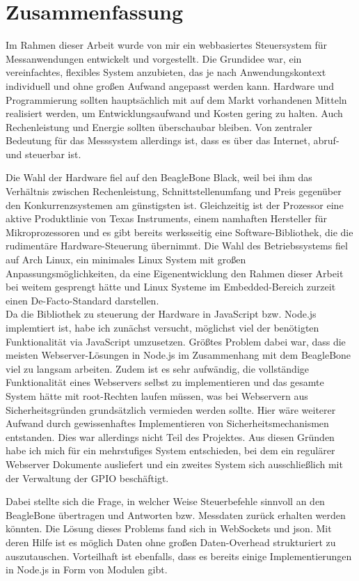 \chapter{Zusammenfassung}
Im Rahmen dieser Arbeit wurde von mir ein webbasiertes Steuersystem für Messanwendungen entwickelt und vorgestellt. Die Grundidee war, ein vereinfachtes, flexibles System anzubieten, das je nach Anwendungskontext individuell und ohne großen Aufwand angepasst werden kann. Hardware und Programmierung sollten hauptsächlich mit auf dem Markt vorhandenen Mitteln realisiert werden, um Entwicklungsaufwand und Kosten gering zu halten. Auch Rechenleistung und Energie sollten überschaubar bleiben. Von zentraler Bedeutung für das Messsystem allerdings ist, dass es über das Internet, abruf- und steuerbar ist.

Die Wahl der Hardware fiel auf den BeagleBone Black, weil bei ihm das Verhältnis zwischen Rechenleistung, Schnittstellenumfang und Preis gegenüber den Konkurrenzsystemen am günstigsten ist. Gleichzeitig ist der Prozessor eine aktive Produktlinie von Texas Instruments, einem namhaften Hersteller für Mikroprozessoren und es gibt bereits werksseitig eine Software-Bibliothek, die die rudimentäre Hardware-Steuerung übernimmt. Die Wahl des Betriebssystems fiel auf Arch Linux, ein minimales Linux System mit großen Anpassungsmöglichkeiten, da eine Eigenentwicklung den Rahmen dieser Arbeit bei weitem gesprengt hätte und Linux Systeme im Embedded-Bereich zurzeit einen De-Facto-Standard darstellen.\\

Da die Bibliothek zu steuerung der Hardware in JavaScript bzw. Node.js implemtiert ist, habe ich zunächst versucht, möglichst viel der benötigten Funktionalität via JavaScript umzusetzen. Größtes Problem dabei war, dass die meisten Webserver-Lösungen in Node.js im Zusammenhang mit dem BeagleBone viel zu langsam arbeiten. Zudem ist es sehr aufwändig,  die vollständige Funktionalität eines Webservers selbst zu implementieren und das gesamte System hätte mit root-Rechten laufen müssen, was bei Webservern aus Sicherheitsgründen grundsätzlich vermieden werden sollte. Hier wäre weiterer Aufwand durch gewissenhaftes Implementieren von Sicherheitsmechanismen entstanden. Dies war allerdings nicht Teil des Projektes. Aus diesen Gründen habe ich mich für ein mehrstufiges System entschieden, bei dem ein regulärer Webserver Dokumente ausliefert und ein zweites System sich ausschließlich mit der Verwaltung der GPIO beschäftigt.

Dabei stellte sich die Frage, in welcher Weise Steuerbefehle sinnvoll an den BeagleBone übertragen und Antworten bzw. Messdaten zurück erhalten werden könnten. Die Lösung dieses Problems fand sich in WebSockets und \gls{json}. Mit deren Hilfe ist es möglich Daten ohne großen Daten-Overhead strukturiert zu auszutauschen. Vorteilhaft ist ebenfalls, dass es bereits einige Implementierungen in Node.js in Form von Modulen gibt.\\

